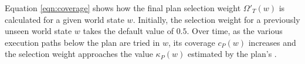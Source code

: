 Equation \ref{eqn:coverage} shows how the final plan selection weight $\Omega'_T(w)$ is calculated for a given world state $w$. Initially, the selection weight for a previously unseen world state $w$ takes the default value of $0.5$. Over time, as the various execution paths below the plan are tried in $w$, its coverage $c_P(w)$ increases and the selection weight approaches the value $\kappa_P(w)$ estimated by the plan's \dt.





